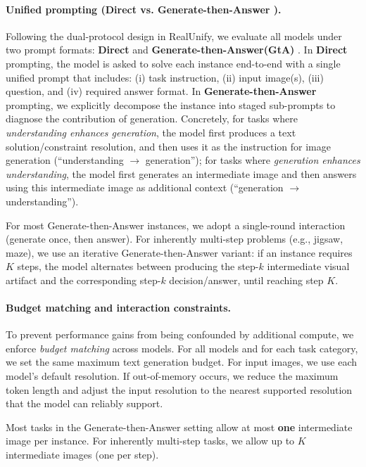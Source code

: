 \documentclass{article}
\theoremstyle{plain}
\theoremstyle{definition}
\theoremstyle{remark}
\begin{document}
\paragraph{Unified prompting (Direct vs. Generate-then-Answer ).}
Following the dual-protocol design in RealUnify, we evaluate all models under two prompt formats: \textbf{Direct} and \textbf{Generate-then-Answer(GtA) }.
In \textbf{Direct} prompting, the model is asked to solve each instance end-to-end with a single unified prompt that includes: (i) task instruction, (ii) input image(s), (iii) question, and (iv) required answer format.
In \textbf{Generate-then-Answer } prompting, we explicitly decompose the instance into staged sub-prompts to diagnose the contribution of generation.
Concretely, for tasks where \emph{understanding enhances generation}, the model first produces a text solution/constraint resolution, and then uses it as the instruction for image generation (``understanding $\rightarrow$ generation'');
for tasks where \emph{generation enhances understanding}, the model first generates an intermediate image and then answers using this intermediate image as additional context (``generation $\rightarrow$ understanding'').

For most Generate-then-Answer  instances, we adopt a single-round interaction (generate once, then answer).
For inherently multi-step problems (e.g., jigsaw, maze), we use an iterative Generate-then-Answer  variant: if an instance requires $K$ steps, the model alternates between producing the step-$k$ intermediate visual artifact and the corresponding step-$k$ decision/answer, until reaching step $K$.

\paragraph{Budget matching and interaction constraints.}
To prevent performance gains from being confounded by additional compute, we enforce \emph{budget matching} across models. For all models and for each task category, we set the same maximum text generation budget. For input images, we use each model's default resolution. If out-of-memory occurs, we reduce the maximum token length and adjust the input resolution to the nearest supported resolution that the model can reliably support.

Most tasks in the Generate-then-Answer  setting allow at most \textbf{one} intermediate image per instance. For inherently multi-step tasks, we allow up to $K$ intermediate images (one per step).
\end{document}
